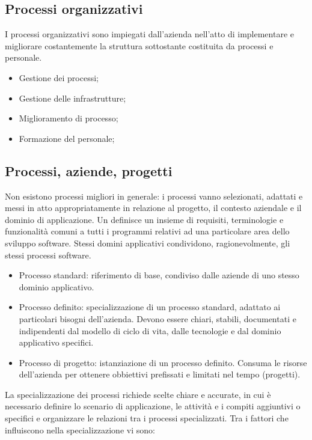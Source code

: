 \subsection{Processi organizzativi}

I processi organizzativi sono impiegati dall'azienda nell'atto di implementare e
migliorare costantemente la struttura sottostante costituita da processi e
personale.

\begin{itemize}
  \item Gestione dei processi;
  \item Gestione delle infrastrutture;
  \item Miglioramento di processo;
  \item Formazione del personale;
\end{itemize}

\subsection{Processi, aziende, progetti}

Non esistono processi migliori in generale: i processi vanno selezionati,
adattati e messi in atto appropriatamente in relazione al progetto, il contesto
aziendale e il dominio di applicazione. Un 
definisce un insieme di requisiti, terminologie e funzionalità comuni a tutti i
programmi relativi ad una particolare area dello sviluppo software. Stessi
domini applicativi condividono, ragionevolmente, gli stessi processi software.

\begin{itemize}
  \item Processo standard: riferimento di base, condiviso dalle aziende di uno
    stesso dominio applicativo.
  \item Processo definito: specializzazione di un processo standard, adattato ai
    particolari bisogni dell'azienda. Devono essere chiari, stabili, documentati
    e indipendenti dal modello di ciclo di vita, dalle tecnologie e dal dominio
    applicativo specifici.
  \item Processo di progetto: istanziazione di un processo definito. Consuma le
    risorse dell'azienda per ottenere obbiettivi prefissati e limitati nel tempo
    (progetti).
\end{itemize}

La specializzazione dei processi richiede scelte chiare e accurate, in cui è
necessario definire lo scenario di applicazione, le attività e i compiti
aggiuntivi o specifici e organizzare le relazioni tra i processi specializzati.
Tra i fattori che influiscono nella specializzazione vi sono:

